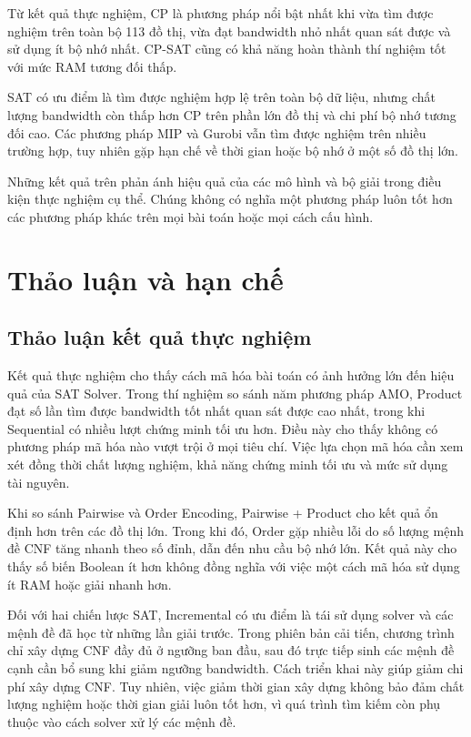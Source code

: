 \documentclass[a4paper,fleqn]{cas-sc}
\begin{document}
Từ kết quả thực nghiệm, CP là phương pháp nổi bật nhất khi vừa tìm được nghiệm trên toàn bộ 113 đồ thị, vừa đạt bandwidth nhỏ nhất quan sát được và sử dụng ít bộ nhớ nhất. CP-SAT cũng có khả năng hoàn thành thí nghiệm tốt với mức RAM tương đối thấp.

SAT có ưu điểm là tìm được nghiệm hợp lệ trên toàn bộ dữ liệu, nhưng chất lượng bandwidth còn thấp hơn CP trên phần lớn đồ thị và chi phí bộ nhớ tương đối cao. Các phương pháp MIP và Gurobi vẫn tìm được nghiệm trên nhiều trường hợp, tuy nhiên gặp hạn chế về thời gian hoặc bộ nhớ ở một số đồ thị lớn.

Những kết quả trên phản ánh hiệu quả của các mô hình và bộ giải trong điều kiện thực nghiệm cụ thể. Chúng không có nghĩa một phương pháp luôn tốt hơn các phương pháp khác trên mọi bài toán hoặc mọi cách cấu hình.
\FloatBarrier



\section{Thảo luận và hạn chế}

\subsection{Thảo luận kết quả thực nghiệm}

Kết quả thực nghiệm cho thấy cách mã hóa bài toán có ảnh hưởng lớn đến hiệu quả của SAT Solver. Trong thí nghiệm so sánh năm phương pháp AMO, Product đạt số lần tìm được bandwidth tốt nhất quan sát được cao nhất, trong khi Sequential có nhiều lượt chứng minh tối ưu hơn. Điều này cho thấy không có phương pháp mã hóa nào vượt trội ở mọi tiêu chí. Việc lựa chọn mã hóa cần xem xét đồng thời chất lượng nghiệm, khả năng chứng minh tối ưu và mức sử dụng tài nguyên.

Khi so sánh Pairwise và Order Encoding, Pairwise + Product cho kết quả ổn định hơn trên các đồ thị lớn. Trong khi đó, Order gặp nhiều lỗi do số lượng mệnh đề CNF tăng nhanh theo số đỉnh, dẫn đến nhu cầu bộ nhớ lớn. Kết quả này cho thấy số biến Boolean ít hơn không đồng nghĩa với việc một cách mã hóa sử dụng ít RAM hoặc giải nhanh hơn.

Đối với hai chiến lược SAT, Incremental có ưu điểm là tái sử dụng solver và các mệnh đề đã học từ những lần giải trước. Trong phiên bản cải tiến, chương trình chỉ xây dựng CNF đầy đủ ở ngưỡng ban đầu, sau đó trực tiếp sinh các mệnh đề cạnh cần bổ sung khi giảm ngưỡng bandwidth. Cách triển khai này giúp giảm chi phí xây dựng CNF. Tuy nhiên, việc giảm thời gian xây dựng không bảo đảm chất lượng nghiệm hoặc thời gian giải luôn tốt hơn, vì quá trình tìm kiếm còn phụ thuộc vào cách solver xử lý các mệnh đề.
\end{document}
